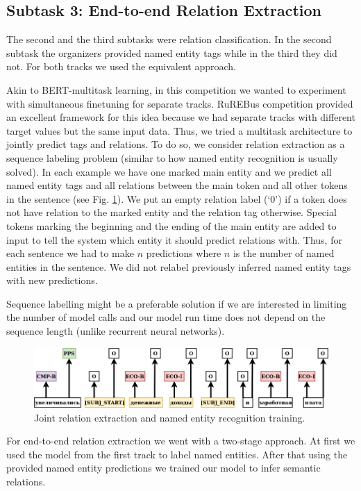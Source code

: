 \documentclass{dialogue}
\begin{document}
	\subsection{Subtask 3: End-to-end Relation Extraction}
	The second and the third subtasks were relation classification. In the second subtask the organizers provided named entity tags while in the third they did not. For both tracks we used the equivalent approach.
	
	Akin to BERT-multitask learning, in this competition we wanted to experiment with simultaneous finetuning for separate tracks. RuREBus competition provided an excellent framework for this idea because we had separate tracks with different target values but the same input data. Thus, we tried a multitask architecture to jointly predict tags and relations. To do so, we consider relation extraction as a sequence labeling problem (similar to how named entity recognition is usually solved). In each example we have one marked main entity and we predict all named entity tags and all relations between the main token and all other tokens in the sentence (see Fig. \ref{fig:rel}). We put an empty relation label (‘0’) if a token does not have relation to the marked entity and the relation tag otherwise. Special tokens marking the beginning and the ending of the main entity are added to input to tell the system which entity it should predict relations with. Thus, for each sentence we had to make $n$ predictions where $n$ is the number of named entities in the sentence. We did not relabel previously inferred named entity tags with new predictions.
	
	Sequence labelling might be a preferable solution if we are interested in limiting the number of model calls and our model run time does not depend on the sequence length (unlike recurrent neural networks).
	
	\begin{figure}[thb]
		\centering
		\includegraphics[scale=0.5]{pics/rel2}
		\caption{Joint relation extraction and named entity recognition training.}
		\label{fig:rel}
	\end{figure}
	
	
	For end-to-end relation extraction we went with a two-stage approach. At first we used the model from the first track to label named entities. After that using the provided named entity predictions we trained our model to infer semantic relations.
	
\end{document}
